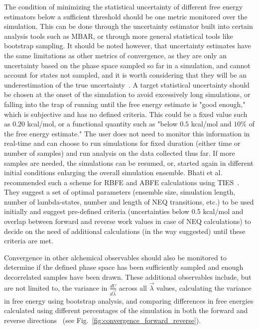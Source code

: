 \documentclass[9pt,bestpractices]{livecoms}
\begin{document}
The condition of minimizing the statistical uncertainty of different free energy estimators below a sufficient threshold should be one metric monitored over the simulation. This can be done through the uncertainty estimator built into certain analysis tools such as MBAR, or through more general statistical tools like bootstrap sampling. It should be noted however, that uncertainty estimates have the same limitations as other metrics of convergence, as they are only an uncertainty based on the phase space sampled so far in a simulation, and cannot account for states not sampled, and it is worth considering that they will be an underestimation of the true uncertainty~\cite{wan2020fep+, wan2021uq, vassaux2021, gapsys2020large, wade2022, bhati2017, bhati2022, bhati2025, wan2023eqvsneq, bhati2018, bhati2019, cournia2017relative, gapsys2021accurate, baumann2021, caves1998}.
A target statistical uncertainty should be chosen at the onset of the simulation to avoid excessively long simulations, or falling into the trap of running until the free energy estimate is "good enough," which is subjective and has no defined criteria. This could be a fixed value such as $0.20$ kcal/mol, or a functional quantity such as "below $0.5$ kcal/mol and $10\%$ of the free energy estimate." The user does not need to monitor this information in real-time and can choose to run simulations for fixed duration (either time or number of samples) and run analysis on the data collected thus far. If more samples are needed, the simulations can be resumed, or, started again in different initial conditions enlarging the overall simulation ensemble. 
Bhati et al. recommended such a scheme for RBFE and ABFE calculations using TIES~\cite{bhati2022, bhati2025, wan2023eqvsneq, coveney2022corners}. They suggest a set of optimal parameters (ensemble size, simulation length, number of lambda-states, number and length of NEQ transitions, etc.) to be used initially and suggest pre-defined criteria (uncertainties below 0.5 kcal/mol and overlap between forward and reverse work values in case of NEQ calculations) to decide on the need of additional calculations (in the way suggested) until these criteria are met.

Convergence in other alchemical observables should also be monitored to determine if the defined phase space has been sufficiently sampled and enough decorrelated samples have been drawn. These additional observables include, but are not limited to, the variance in $\frac{dU}{d\vec{\lambda}}$ across all $\vec{\lambda}$ values, calculating the variance in free energy using bootstrap analysis, and comparing differences in free energies calculated using different percentages of the simulation in both the forward and reverse directions~\cite{klimovich2015guidelines} (see Fig.~\ref{fig:convergence_forward_reverse}).
\end{document}
